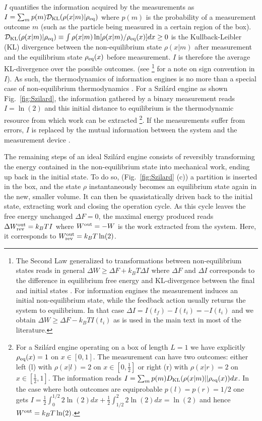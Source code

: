 \documentclass[aps, twocolumn,floatfix,showpacs, superscriptaddress]{revtex4-2}
\newcommand{\ie}{information engines }
\newcommand{\se}{Szil\'ard engine }
\begin{document}
$I$ quantifies the information acquired by the measurements as $I = \sum_{m} p(m) \mathcal{D}_{\rm KL}(\rho(x|m) | \rho_{\rm eq})$ where $p(m)$ is the probability of a measurement outcome $m$ (such as the particle being measured in a certain region of the box).
$\mathcal{D}_{\rm KL}(\rho(x|m) | \rho_{\rm eq}) \equiv \int \rho(x|m) \ln [\rho(x|m) / \rho_{\rm eq}(x)] dx \geq 0$ is the Kullback-Leibler (KL) divergence between the non-equilibrium state $\rho(x|m)$ after measurement and the equilibrium state $\rho_{\rm eq}(x)$ before measurement.
$I$ is therefore the average KL-divergence over the possible outcomes. (see \footnote{The Second Law generalized to transformations between non-equilibrium states reads in general $\Delta W \geq \Delta F + k_B T \Delta I$ where $\Delta F$ and $\Delta I$ corresponds to the difference in equilibrium free energy and KL-divergence between the final and initial states \cite{esposito_second_2011}. For \ie the measurement induces an initial non-equilibrium state, while the feedback action usually returns the system to equilibrium. In that case $\Delta I = I(t_f) - I(t_i) = -I(t_i)$ and we obtain $\Delta W \geq \Delta F - k_B T I(t_i)$ as is used in the main text in most of the literature.} for a note on sign convention in $I$).
As such, the thermodynamics of \ie is no more than a special case of non-equilibrium thermodynamics \cite{Parrondo_2015}.
For a \se as shown Fig.~\ref{fig:Szilard}, the information gathered by a binary measurement reads $I = \ln(2)$ and this initial distance to equilibrium is the thermodynamic resource from which work can be extracted \footnote{For a Szil\'ard engine operating on a box of length $L = 1$ we have explicitly $\rho_{\rm eq}(x) = 1$ on $x \in [0, 1]$. The measurement can have two outcomes: either left (l) with $\rho(x|l) = 2$ on $x \in [0, \frac{1}{2}]$ or right (r) with $\rho(x|r) = 2$ on $x \in [\frac{1}{2}, 1]$. The information reads
$I = \sum_m p(m) D_{\rm KL}(\rho(x|m)||\rho_{\rm eq}(x))dx$. In the case where both outcomes are equiprobable $p(l) = p(r) = 1/2$ one gets  $I = \frac{1}{2} \int_0^{1/2} 2 \ln(2) dx + \frac{1}{2} \int_{1/2}^2 2 \ln(2) dx = \ln(2)$ and hence $W^{\rm out} = k_B T \ln(2)$.}.
If the measurements suffer from errors, $I$ is replaced by the mutual information between the system and the measurement device \cite{KoskiMutual2024}.

The remaining steps of an ideal \se consists of reversibly transforming the energy contained in the non-equilibrium state into mechanical work, ending up back in the initial state.
To do so, (Fig.~\ref{fig:Szilard} (c)) a partition is inserted in the box, and the state $\rho$ instantaneously becomes an equilibrium state again in the new, smaller volume.
It can then be quasistatically driven back to the initial state, extracting work and closing the operation cycle.
As this cycle leaves the free energy unchanged $\Delta F = 0$, the maximal energy produced reads $ \Delta W^{\rm out}_{\rm rev} = k_B T I$ where $W^{\rm out} = - W$ is the work extracted from the system.
Here, it corresponds to $W^{\rm out}_{\rm rev} = k_B T \ln(2)$.
\end{document}
